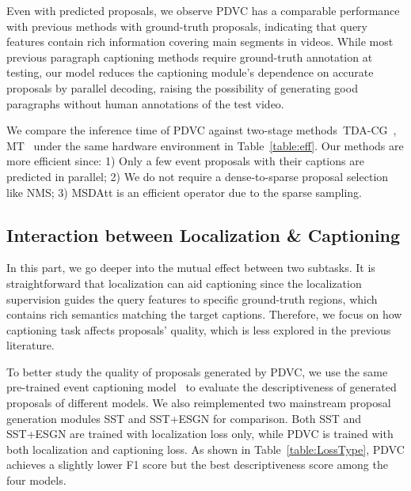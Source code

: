 Even with predicted proposals, we observe PDVC has a comparable performance with previous methods with ground-truth proposals, indicating that query features contain rich information covering main segments in videos. While most previous paragraph captioning methods require ground-truth annotation at testing, our model reduces the captioning module's dependence on accurate proposals by parallel decoding, raising the possibility of generating good paragraphs without human annotations of the test video.

\vspace{0.5em}
 We compare the inference time of PDVC against two-stage methods~TDA-CG~\cite{wang2018bidirectional}, MT~\cite{zhou2018end} under the same hardware environment in Table~\ref{table:eff}. Our methods are more efficient since: 1) Only a few event proposals with their captions are predicted in parallel; 2) We do not require a dense-to-sparse proposal selection like NMS; 3) MSDAtt is an efficient operator due to the sparse sampling. 


\subsection{Interaction between Localization \& Captioning}
\label{sec: interaction}

In this part, we go deeper into the mutual effect between two subtasks. It is straightforward that localization can aid captioning since the localization supervision guides the query features to specific ground-truth regions, which contains rich semantics matching the target captions. Therefore, we focus on how captioning task affects proposals' quality, which is less explored in the previous literature.

\vspace{0.5em}
 To better study the quality of proposals generated by PDVC,  
we use the same pre-trained event captioning model~\cite{yao2015describing} to evaluate the descriptiveness of generated proposals of different models. 
We also reimplemented two mainstream proposal generation modules SST and SST+ESGN for comparison. 
Both SST and SST+ESGN are trained with localization loss only, while PDVC is trained with both localization and captioning loss. As shown in Table~\ref{table:LossType}, PDVC achieves a slightly lower F1 score but the best descriptiveness score among the four models.


